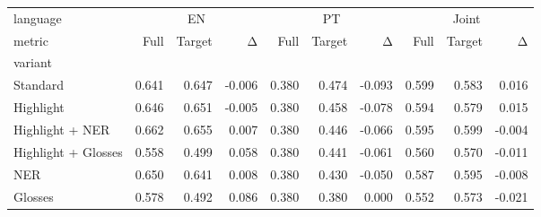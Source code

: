 \begin{tabular}{lrrrrrrrrr}
\toprule
language & \multicolumn{3}{c}{EN} & \multicolumn{3}{c}{PT} & \multicolumn{3}{c}{Joint} \\
metric & Full & Target & Δ & Full & Target & Δ & Full & Target & Δ \\
variant &  &  &  &  &  &  &  &  &  \\
\midrule
Standard & 0.641 & 0.647 & -0.006 & 0.380 & 0.474 & -0.093 & 0.599 & 0.583 & 0.016 \\
Highlight & 0.646 & 0.651 & -0.005 & 0.380 & 0.458 & -0.078 & 0.594 & 0.579 & 0.015 \\
Highlight + NER & 0.662 & 0.655 & 0.007 & 0.380 & 0.446 & -0.066 & 0.595 & 0.599 & -0.004 \\
Highlight + Glosses & 0.558 & 0.499 & 0.058 & 0.380 & 0.441 & -0.061 & 0.560 & 0.570 & -0.011 \\
NER & 0.650 & 0.641 & 0.008 & 0.380 & 0.430 & -0.050 & 0.587 & 0.595 & -0.008 \\
Glosses & 0.578 & 0.492 & 0.086 & 0.380 & 0.380 & 0.000 & 0.552 & 0.573 & -0.021 \\
\bottomrule
\end{tabular}
